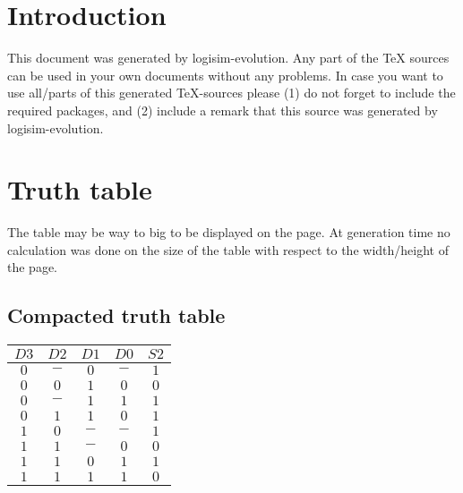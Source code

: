 \documentclass [15pt,a4paper,twoside]{article}
\begin{document}
\section{Introduction}
This document was generated by logisim-evolution. Any part of the TeX sources can be used in your own documents without any problems. In case you want to use all/parts of this generated TeX-sources please (1) do not forget to include the required packages, and (2) include a remark that this source was generated by logisim-evolution.
\section{Truth table}
The table may be way to big to be displayed on the page. At generation time no calculation was done on the size of the table with respect to the width/height of the page.
\subsection{Compacted truth table}
\begin{center}
\begin{tabular}{cccc|c}
$D3$&$D2$&$D1$&$D0$&$S2$\\
\hline
$0$&$-$&$0$&$-$&$1$\\
$0$&$0$&$1$&$0$&$0$\\
$0$&$-$&$1$&$1$&$1$\\
$0$&$1$&$1$&$0$&$1$\\
$1$&$0$&$-$&$-$&$1$\\
$1$&$1$&$-$&$0$&$0$\\
$1$&$1$&$0$&$1$&$1$\\
$1$&$1$&$1$&$1$&$0$\\

\end{tabular}
\end{center}
\end{document}
